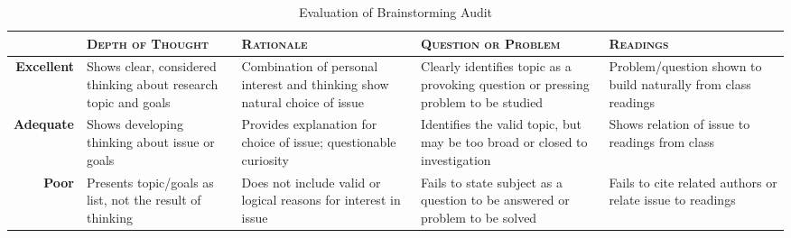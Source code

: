 \documentclass[12pt,oneside]{amsart}	%
\begin{document}
\begin{table}[b]
	\caption{Evaluation of Brainstorming Audit}\label{tab:rubric}
\begin{tabulary}{\textwidth}{rLLLL}
	\toprule  & \textbf{\textsc{Depth of Thought}} & \textbf{\textsc{Rationale}} & \textbf{\textsc{Question or Problem}} & \textbf{\textsc{Readings}}\\
\midrule	\textbf{Excellent} & Shows clear, considered thinking about research topic and goals & Combination of personal interest and thinking show natural choice of issue & Clearly identifies topic as a provoking question or pressing problem to be studied & Problem/question shown to build naturally from class readings \\
\midrule	\textbf{Adequate} & Shows developing thinking about issue or goals & Provides explanation for choice of issue; questionable curiosity & Identifies the valid topic, but may be too broad or closed to investigation & Shows relation of issue to readings from class \\
\midrule	\textbf{Poor} & Presents topic/goals as list, not the result of thinking & Does not include valid or logical reasons for interest in issue & Fails to state subject as a question to be answered or problem to be solved & Fails to cite related authors or relate issue to readings \\
	\bottomrule
\end{tabulary}
\end{table}

\begin{comment}
	\section{Formatting} %
	\label{sec:formatting}
	While this document isn't your typical formal research report, you should get in the habit of formatting your documents to meet the guidelines of an appropriate style, such as the \textsc{mla} or \textsc{apa}. An \textsc{mla}-formatted template is available from Webcourses. Regardless, be sure your document meets these requirements:
	\begin{itemize}
		\item double-spaced lines,
		\item one-inch margins on all sides and half-inch indents for paragraphs,
		\item a 12-point typeface with serifs (like Times New Roman, \emph{not} Calibri), and
		\item parenthetical citations and a Works Cited or References page, as appropriate.
	\end{itemize}
\end{comment}
\end{document}
